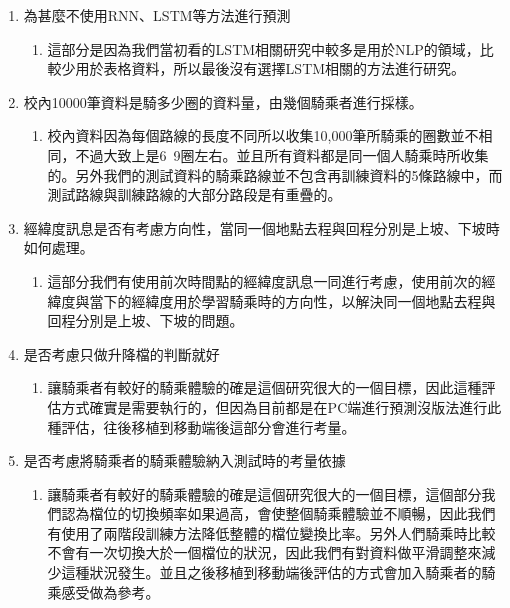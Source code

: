 \begin{enumerate}
\begin{enumerate}[Ans.]
	\end{enumerate}

	\item 為甚麼不使用RNN、LSTM等方法進行預測
	\begin{enumerate}[Ans.]
		\item 這部分是因為我們當初看的LSTM相關研究中較多是用於NLP的領域，比較少用於表格資料，所以最後沒有選擇LSTM相關的方法進行研究。
	\end{enumerate}

	\item 校內10000筆資料是騎多少圈的資料量，由幾個騎乘者進行採樣。
	\begin{enumerate}[Ans.]
		\item 校內資料因為每個路線的長度不同所以收集10,000筆所騎乘的圈數並不相同，不過大致上是6~9圈左右。並且所有資料都是同一個人騎乘時所收集的。另外我們的測試資料的騎乘路線並不包含再訓練資料的5條路線中，而測試路線與訓練路線的大部分路段是有重疊的。
	\end{enumerate}
	
	\item 經緯度訊息是否有考慮方向性，當同一個地點去程與回程分別是上坡、下坡時如何處理。
	\begin{enumerate}[Ans.]
		\item 這部分我們有使用前次時間點的經緯度訊息一同進行考慮，使用前次的經緯度與當下的經緯度用於學習騎乘時的方向性，以解決同一個地點去程與回程分別是上坡、下坡的問題。
	\end{enumerate}

	\item 是否考慮只做升降檔的判斷就好
	\begin{enumerate}[Ans.]
		\item 讓騎乘者有較好的騎乘體驗的確是這個研究很大的一個目標，因此這種評估方式確實是需要執行的，但因為目前都是在PC端進行預測沒版法進行此種評估，往後移植到移動端後這部分會進行考量。
	\end{enumerate}

	\item 是否考慮將騎乘者的騎乘體驗納入測試時的考量依據
	\begin{enumerate}[Ans.]
		\item 讓騎乘者有較好的騎乘體驗的確是這個研究很大的一個目標，這個部分我們認為檔位的切換頻率如果過高，會使整個騎乘體驗並不順暢，因此我們有使用了兩階段訓練方法降低整體的檔位變換比率。另外人們騎乘時比較不會有一次切換大於一個檔位的狀況，因此我們有對資料做平滑調整來減少這種狀況發生。並且之後移植到移動端後評估的方式會加入騎乘者的騎乘感受做為參考。
	\end{enumerate}



\end{enumerate}
